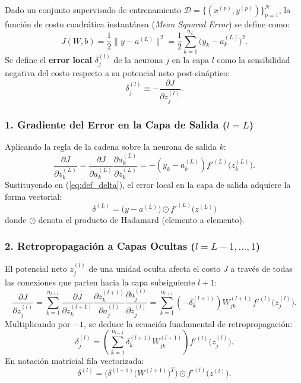 \documentclass[11pt,letterpaper]{article}
\begin{document}
Dado un conjunto supervisado de entrenamiento $\mathcal{D} = \{(x^{(p)}, y^{(p)})\}_{p=1}^N$, la función de costo cuadrática instantánea (\textit{Mean Squared Error}) se define como:
\begin{equation}
    J(W, b) = \frac{1}{2} \|y - a^{(L)}\|^2 = \frac{1}{2} \sum_{k=1}^{n_L} \big(y_k - a_k^{(L)}\big)^2.
    \label{eq:costo_cuadratico}
\end{equation}
Se define el \textbf{error local} $\delta_j^{(l)}$ de la neurona $j$ en la capa $l$ como la sensibilidad negativa del costo respecto a su potencial neto post-sináptico:
\begin{equation}
    \delta_j^{(l)} \equiv -\frac{\partial J}{\partial z_j^{(l)}}.
    \label{eq:def_delta}
\end{equation}

\subsubsection{1. Gradiente del Error en la Capa de Salida ($l = L$)}
Aplicando la regla de la cadena sobre la neurona de salida $k$:
\begin{equation}
    \frac{\partial J}{\partial z_k^{(L)}} = \frac{\partial J}{\partial a_k^{(L)}} \frac{\partial a_k^{(L)}}{\partial z_k^{(L)}} = -(y_k - a_k^{(L)}) f'^{(L)}\big(z_k^{(L)}\big).
\end{equation}
Sustituyendo en (\ref{eq:def_delta}), el error local en la capa de salida adquiere la forma vectorial:
\begin{equation}
    \delta^{(L)} = \big(y - a^{(L)}\big) \odot f'^{(L)}\big(z^{(L)}\big)
    \label{eq:delta_salida_vectorial}
\end{equation}
donde $\odot$ denota el producto de Hadamard (elemento a elemento).

\subsubsection{2. Retropropagación a Capas Ocultas ($l = L-1, \dots, 1$)}
El potencial neto $z_j^{(l)}$ de una unidad oculta afecta el costo $J$ a través de todas las conexiones que parten hacia la capa subsiguiente $l+1$:
\begin{equation}
    \frac{\partial J}{\partial z_j^{(l)}} = \sum_{k=1}^{n_{l+1}} \frac{\partial J}{\partial z_k^{(l+1)}} \frac{\partial z_k^{(l+1)}}{\partial a_j^{(l)}} \frac{\partial a_j^{(l)}}{\partial z_j^{(l)}} = \sum_{k=1}^{n_{l+1}} (-\delta_k^{(l+1)}) W_{jk}^{(l+1)} f'^{(l)}\big(z_j^{(l)}\big).
\end{equation}
Multiplicando por $-1$, se deduce la ecuación fundamental de retropropagación:
\begin{equation}
    \delta_j^{(l)} = \left( \sum_{k=1}^{n_{l+1}} \delta_k^{(l+1)} W_{jk}^{(l+1)} \right) f'^{(l)}\big(z_j^{(l)}\big).
    \label{eq:delta_oculta_escalar}
\end{equation}
En notación matricial fila vectorizada:
\begin{equation}
    \delta^{(l)} = \Big( \delta^{(l+1)} \big(W^{(l+1)}\big)^T \Big) \odot f'^{(l)}\big(z^{(l)}\big).
    \label{eq:delta_oculta_vectorial}
\end{equation}
\end{document}
